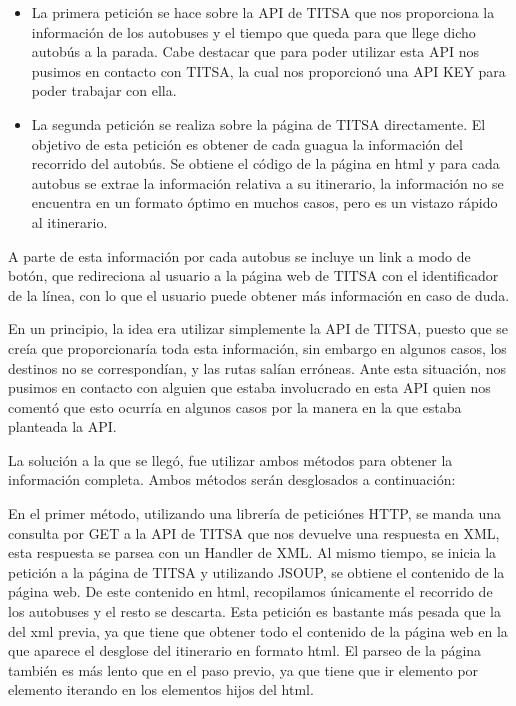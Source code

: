 \begin{itemize}
\item La primera petición se hace sobre la API de TITSA que nos proporciona la información de los autobuses y el tiempo que queda para que llege dicho autobús a la parada. Cabe destacar que para poder utilizar esta API nos pusimos en contacto con TITSA, la cual nos proporcionó una API KEY para poder trabajar con ella.
\item La segunda petición se realiza sobre la página de TITSA directamente. El objetivo de esta petición es obtener de cada guagua la información del recorrido del autobús. Se obtiene el código de la página en html y para cada autobus se extrae la información relativa a su itinerario, la información no se encuentra en un formato óptimo en muchos casos, pero es un vistazo rápido al itinerario.
\end{itemize}

A parte de esta información por cada autobus se incluye un link a modo de botón, que redireciona al usuario a la página web de TITSA con el identificador de la línea, con lo que el usuario puede obtener más información en caso de duda.

En un principio, la idea era utilizar simplemente la API de TITSA, puesto que se creía que proporcionaría toda esta información, sin embargo en algunos casos, los destinos no se correspondían, y las rutas salían erróneas. Ante esta situación, nos pusimos en contacto con alguien que estaba involucrado en esta API quien nos comentó que esto ocurría en algunos casos por la manera en la que estaba planteada la API.

La solución a la que se llegó, fue utilizar ambos métodos para obtener la información completa. Ambos métodos serán desglosados a continuación: 

En el primer método, utilizando una librería de peticiónes HTTP, se manda una consulta por GET a la API de TITSA que nos devuelve una respuesta en XML, esta respuesta se parsea con un Handler de XML. Al mismo tiempo, se inicia la petición a la página de TITSA y utilizando JSOUP, se obtiene el contenido de la página web. De este contenido en html, recopilamos únicamente el recorrido de los autobuses y el resto se descarta. Esta petición es bastante más pesada que la del xml previa, ya que tiene que obtener todo el contenido de la página web en la que aparece el desglose del itinerario en formato html. El parseo de la página también es más lento que en el paso previo, ya que tiene que ir elemento por elemento iterando en los elementos hijos del html.


